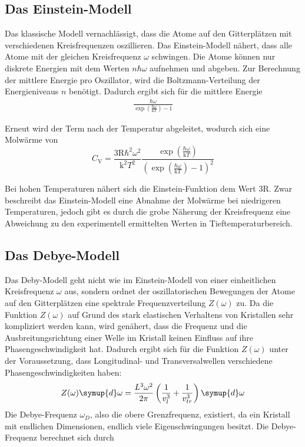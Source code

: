 \subsection{Das Einstein-Modell}
Das klassische Modell vernachlässigt, dass die Atome auf den Gitterplätzen
mit verschiedenen Kreisfrequenzen oszillieren. Das Einstein-Modell nähert,
dass alle Atome mit der gleichen Kreisfrequenz $\omega$ schwingen. Die Atome
können nur diskrete Energien mit dem Werten $n \hbar \omega$ aufnehmen und
abgeben. Zur Berechnung der mittlere Energie pro Oszillator, wird die
Boltzmann-Verteilung der Energieniveaus $n$ benötigt. Dadurch ergibt sich
für die mittlere Energie
\begin{align*}
  \frac{\hbar \omega}{\exp\left(\frac{\hbar \omega}{\text{k} T} \right) -1}
\end{align*}

Erneut wird der Term nach der Temperatur abgeleitet, wodurch sich eine Molwärme
von
\begin{equation}
  C_{\text{V}} = \frac{3 \text{R} \hbar^2 \omega^2}{\text{k}^2 T^2}
  \frac{\exp\left(\frac{\hbar \omega}{\text{k} T}\right)}{\left(\exp\left(\frac{\hbar \omega}{\text{k} T}\right) -1 \right)^2}
\end{equation}

Bei hohen Temperaturen nähert sich die Einstein-Funktion dem Wert $3 \text{R}$.
Zwar beschreibt das Einstein-Modell eine Abnahme der Molwärme bei niedrigeren
Temperaturen, jedoch gibt es durch die grobe Näherung der Kreisfrequenz eine
Abweichung zu den experimentell ermittelten Werten in Tieftemperaturbereich.

\subsection{Das Debye-Modell}
Das Deby-Modell geht nicht wie im Einstein-Modell von einer einheitlichen
Kreisfrequenz $\omega$ aus, sondern ordnet der oszillatorischen Bewegungen
der Atome auf den Gitterplätzen eine spektrale Frequenzverteilung $Z(\omega)$
zu. Da die Funktion $Z(\omega)$ auf Grund des stark elastischen Verhaltens
von Kristallen sehr kompliziert werden kann, wird genähert, dass die Frequenz
und die Ausbreitungsrichtung einer Welle im Kristall keinen Einfluss auf
ihre Phasengeschwindigkeit hat. Dadurch ergibt sich für die Funktion $Z(\omega)$
unter der Voraussetzung, dass Longitudinal- und Transversalwellen verschiedene
Phasengeschwindigkeiten haben:
\begin{equation}
  Z(\omega) \symup{d} \omega = \frac{L^3 \omega^2}{2 \pi}
  \left(\frac{1}{v_l^3} + \frac{1}{v_{tr}^3} \right) \symup{d}\omega
\end{equation}
Die Debye-Frequenz $\omega_D$, also die obere Grenzfrequenz, existiert, da ein
Kristall mit endlichen Dimensionen, endlich viele Eigenschwingungen besitzt.
Die Debye-Frequenz
berechnet sich durch

